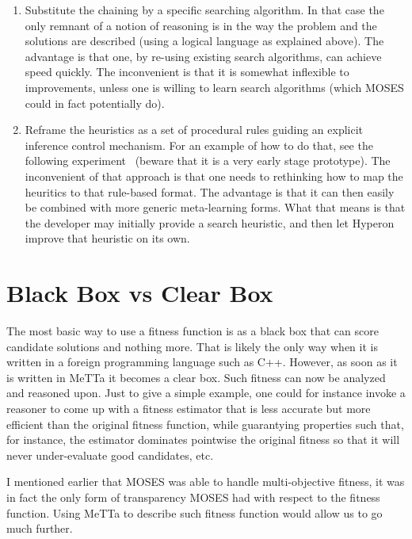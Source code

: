 \documentclass[]{report}
\begin{document}
\begin{enumerate}
\begin{enumerate}
   \item Substitute the chaining by a specific searching algorithm.  In
      that case the only remnant of a notion of reasoning is in the
      way the problem and the solutions are described (using a logical
      language as explained above).  The advantage is that one, by
      re-using existing search algorithms, can achieve speed quickly.
      The inconvenient is that it is somewhat inflexible to
      improvements, unless one is willing to learn search algorithms
      (which MOSES could in fact potentially do).
   \item Reframe the heuristics as a set of procedural rules guiding an
      explicit inference control mechanism.  For an example of how to
      do that, see the following experiment~\cite{InfControl}
      (beware that it is a very early stage prototype).  The
      inconvenient of that approach is that one needs to rethinking
      how to map the heuritics to that rule-based format.  The
      advantage is that it can then easily be combined with more
      generic meta-learning forms.  What that means is that the
      developer may initially provide a search heuristic, and then let
      Hyperon improve that heuristic on its own.
   \end{enumerate}
\end{enumerate}

\section{Black Box vs Clear Box}
\label{sec:blackbox-clearbox}

The most basic way to use a fitness function is as a black box that
can score candidate solutions and nothing more.  That is likely the
only way when it is written in a foreign programming language such as
C++.  However, as soon as it is written in MeTTa it becomes a clear
box.  Such fitness can now be analyzed and reasoned upon.  Just to
give a simple example, one could for instance invoke a reasoner to
come up with a fitness estimator that is less accurate but more
efficient than the original fitness function, while guarantying
properties such that, for instance, the estimator dominates pointwise
the original fitness so that it will never under-evaluate good
candidates, etc.

I mentioned earlier that MOSES was able to handle multi-objective
fitness, it was in fact the only form of transparency MOSES had with
respect to the fitness function.  Using MeTTa to describe such fitness
function would allow us to go much further.
\end{document}
